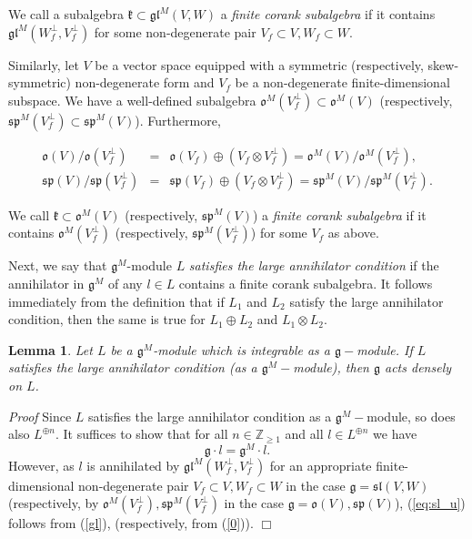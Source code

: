 \documentclass{svmult}
\newtheorem{lem}[theo]{Lemma}
\renewenvironment{proof}{ \emph{Proof}}{$\Box$}
\newcommand {\ZZ} {\mathbb {Z}}
\renewcommand{\sp}{\mathfrak{sp}}
\renewcommand{\sl}{\mathfrak{sl}}
\newcommand{\kk}{\mathfrak{k}}
\newcommand{\oo}{\mathfrak{o}}
\renewcommand{\gg}{\mathfrak{g}}
\newcommand{\gl}{\mathfrak{gl}}
\begin{document}
We call a subalgebra $\kk\subset \gl^M(V,W)$ a \textit{finite corank subalgebra} if it contains  
$\gl^M(W_f^\perp,V_f^\perp)$ for some non-degenerate pair $V_f \subset V, W_f \subset W$.

Similarly, let $V$ be a vector space equipped with a symmetric (respectively, skew-symmetric) non-degenerate form and $V_f$ be a non-degenerate finite-dimensional
subspace. We have a well-defined subalgebra $\oo^M(V_f^\perp)\subset \oo^M(V)$
(respectively, $\sp^M(V_f^\perp)\subset \sp^M(V)$). Furthermore,

\begin{eqnarray}\label{0}
\oo(V)/\oo(V_f^\perp)&=&\oo(V_f)\oplus (V_f\otimes V_f^\perp)=\oo^M(V)/\oo^M(V_f^\perp),\nonumber\\
\sp(V)/\sp(V_f^\perp)&=&\sp(V_f)\oplus (V_f\otimes V_f^\perp)=\sp^M(V)/\sp^M(V_f^\perp).
\end{eqnarray} 

We call $\kk\subset \oo^M(V)$ (respectively, $\sp^M(V)$) a \textit{finite corank subalgebra}  if  
it contains $ \oo^M(V_f^\perp)$ (respectively, $\sp^M(V_f^\perp)$) for some $V_f$ as above.

Next, we say that $\gg^M$-module $L$ {\it satisfies the large annihilator condition} if the annihilator in $\gg^M$ of any $l\in L$
contains a finite corank subalgebra. It follows immediately from the 	definition that if $L_1$ and $L_2$ satisfy the large annihilator condition,
then the same is true for $L_1\oplus L_2$ and $L_1\otimes L_2$.

\begin{lem}\label{corank2} 
Let $L$ be a $\gg^M$-module which is integrable as a $\gg-$module. 
If $L$ satisfies the large annihilator condition (as a $\gg^M-$module), then $\gg$ acts densely on $L$. 
\end{lem}
\begin{proof} Since $L$ satisfies the large annihilator condition as a $\gg^M-$module, so does also $L^{\oplus n}$. It suffices to show that for all $n \in \ZZ_{\geq 1}$ and all $l\in L^{\oplus n}$ 
we have 
\begin{equation}\label{eq:sl_u}
 \gg\cdot l=\gg^M\cdot l.
\end{equation}
However, as $l$ is annihilated by $\gl^M(W_f^\perp,V_f^\perp)$ for an appropriate finite-dimensional non-degenerate pair $V_f \subset V, W_f \subset W$ in the case $\gg = \sl(V,W)$ (respectively, by $\oo^M(V_f^{\perp}),\sp^M(V_f^{\perp})$ in the case $\gg = \oo(V),\sp(V)$), (\ref{eq:sl_u}) follows from (\ref{gl}), (respectively, from (\ref{0})).
\end{proof}
\end{document}
